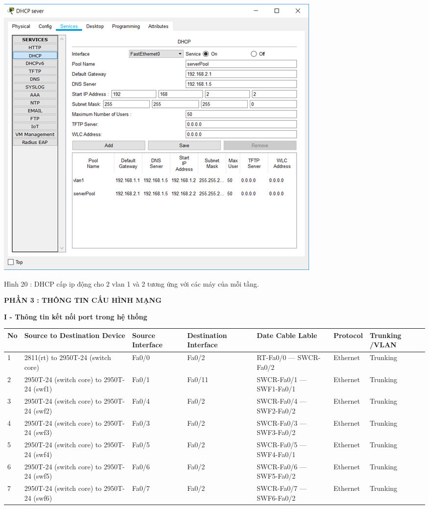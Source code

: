 \documentclass{report}
\begin{document}
\begin{center}
     \includegraphics[scale=0.6]{im3}
\end{center}
\centerline{Hình 20 : DHCP cấp ip động cho 2 vlan 1 và 2 tương ứng với các máy của mỗi tầng.}
\bigskip


\newpage
\changefontsizes{16pt}
\centerline{\textbf{PHẦN 3 : THÔNG TIN CẤU HÌNH MẠNG}}
\changefontsizes{14pt}

\bigskip
\setlength{\parindent}{0.2cm}
\textbf{I - Thông tin kết nối port trong hệ thống}
\smallskip

\changefontsizes{12pt}

\begin{tabular}{|m{0.4cm}|m{2.15cm}|m{1.65cm}|m{2.2cm}|m{2.5cm}|m{1.6cm}|m{2cm}|}
    \hline
    No & Source to Destination Device & Source Interface&Destination Interface & Date Cable Lable & Protocol & Trunking /VLAN \\ 
    \hline
    1 & 2811(rt) to 2950T-24 (switch core) & Fa0/0 & Fa0/2 & RT-Fa0/0 --- SWCR-Fa0/2&Ethernet & Trunking \\ 
    \hline
    2 & 2950T-24 (switch core) to 2950T-24 (swf1) & Fa0/1 & Fa0/11 & SWCR-Fa0/1 --- SWF1-Fa0/1 & Ethernet & Trunking \\ 
    \hline
    3 & 2950T-24 (switch core) to 2950T-24 (swf2) & Fa0/4 & Fa0/2 & SWCR-Fa0/4 --- SWF2-Fa0/2 & Ethernet & Trunking \\
    \hline
    4 & 2950T-24 (switch core) to 2950T-24 (swf3) & Fa0/3 & Fa0/2 & SWCR-Fa0/3 --- SWF3-Fa0/2 & Ethernet & Trunking \\
    \hline
	5 & 2950T-24 (switch core) to 2950T-24 (swf4) & Fa0/5 & Fa0/2 & SWCR-Fa0/5 --- SWF4-Fa0/1 & Ethernet & Trunking \\
	\hline
	6 & 2950T-24 (switch core) to 2950T-24 (swf5) & Fa0/6 & Fa0/2 & SWCR-Fa0/6 --- SWF5-Fa0/2 & Ethernet & Trunking \\
	\hline
	7 & 2950T-24 (switch core) to 2950T-24 (swf6) & Fa0/7 & Fa0/2 & SWCR-Fa0/7 --- SWF6-Fa0/2 & Ethernet & Trunking \\
	\hline
\end{tabular}
\end{document}
